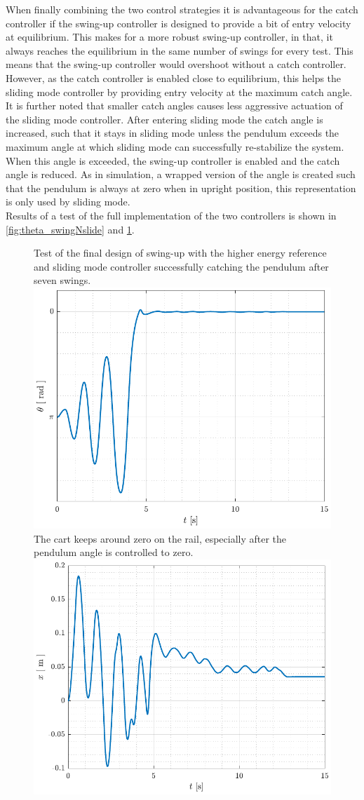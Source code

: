 When finally combining the two control strategies it is advantageous for the catch controller if the swing-up controller is designed to provide a bit of entry velocity at equilibrium. This makes for a more robust swing-up controller, in that, it always reaches the equilibrium in the same number of swings for every test. This means that the swing-up controller would overshoot without a catch controller. However, as the catch controller is enabled close to equilibrium, this helps the sliding mode controller by providing entry velocity at the maximum catch angle.\\
It is further noted that smaller catch angles causes less aggressive actuation of the sliding mode controller. After entering sliding mode the catch angle is increased, such that it stays in sliding mode unless the pendulum exceeds the maximum angle at which sliding mode can successfully re-stabilize the system. When this angle is exceeded, the swing-up controller is enabled and the catch angle is reduced. As in simulation, a wrapped version of the angle is created such that the pendulum is always at zero when in upright position, this representation is only used by sliding mode.\\
Results of a test of the full implementation of the two controllers is shown in \autoref{fig:theta_swingNslide} and \ref{fig:x_swingNslide}.
%
%
\begin{figure}[H]
  \hspace{1cm}
  \captionbox
  {
    Test of the final design of swing-up with the higher energy reference and sliding mode controller successfully catching the pendulum after seven swings.
    \label{fig:theta_swingNslide}
  }
  {
    \hspace{-1cm}
    \includegraphics[width=.384\textwidth]{figures/theta_swingNslide}
  }
  \hspace{20pt}
  \captionbox 
  {
    The cart keeps around zero on the rail, especially after the pendulum angle is controlled to zero.
    \label{fig:x_swingNslide}
  }
  {
    \hspace{-1cm}
    \includegraphics[width=.4\textwidth]{figures/x_swingNslide}
  }  
\end{figure}
